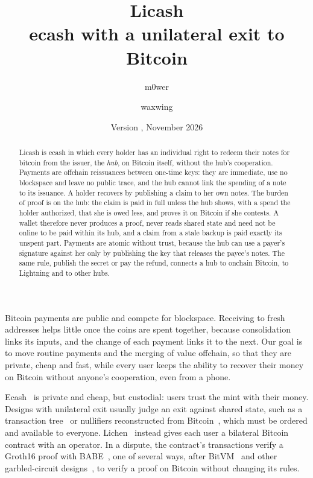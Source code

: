\documentclass[11pt]{article}
\title{\textbf{Licash}\\ecash with a unilateral exit to Bitcoin}
\author{m0wer \and waxwing}
\date{Version \paperversion, November 2026}
\makeatletter
\renewcommand\section{\@startsection{section}{1}{\z@}{-2.5ex plus -1ex minus -.2ex}{1.2ex plus .2ex}{\large\bfseries}}
\makeatother
\begin{document}
\maketitle

\begin{abstract}
Licash is ecash in which every holder has an individual right to redeem their notes for bitcoin from the issuer, the \emph{hub}, on Bitcoin itself, without the hub's cooperation. Payments are offchain reissuances between one-time keys: they are immediate, use no blockspace and leave no public trace, and the hub cannot link the spending of a note to its issuance. A holder recovers by publishing a claim to her own notes. The burden of proof is on the hub: the claim is paid in full unless the hub shows, with a spend the holder authorized, that she is owed less, and proves it on Bitcoin if she contests. A wallet therefore never produces a proof, never reads shared state and need not be online to be paid within its hub, and a claim from a stale backup is paid exactly its unspent part. Payments are atomic without trust, because the hub can use a payer's signature against her only by publishing the key that releases the payee's notes. The same rule, publish the secret or pay the refund, connects a hub to onchain Bitcoin, to Lightning and to other hubs.
\end{abstract}

\section{Introduction}

Bitcoin payments are public and compete for blockspace. Receiving to fresh addresses helps little once the coins are spent together, because consolidation links its inputs, and the change of each payment links it to the next. Our goal is to move routine payments and the merging of value offchain, so that they are private, cheap and fast, while every user keeps the ability to recover their money on Bitcoin without anyone's cooperation, even from a phone.

Ecash~\cite{chaum,cashu,fedimint} is private and cheap, but custodial: users trust the mint with their money. Designs with unilateral exit usually judge an exit against shared state, such as a transaction tree~\cite{ark} or nullifiers reconstructed from Bitcoin~\cite{shieldedcsv,shieldedbitcoin}, which must be ordered and available to everyone. Lichen~\cite{lichen} instead gives each user a bilateral Bitcoin contract with an operator. In a dispute, the contract's transactions verify a Groth16 proof with BABE~\cite{babe}, one of several ways, after BitVM~\cite{bitvm,bitvm2} and other garbled-circuit designs~\cite{bitvm3,glock}, to verify a proof on Bitcoin without changing its rules.
\end{document}
